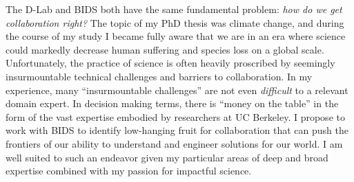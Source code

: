 






\lehead[]{\pagemark}
\rohead[]{\pagemark}




The D-Lab and BIDS both have the same fundamental problem: \emph{how do we get
    collaboration right?} The topic of my PhD thesis was climate change, and
during the course of my study I became fully aware that we are in an era where
science could markedly decrease human suffering and species loss on a global
scale. Unfortunately, the practice of science is often heavily proscribed by
seemingly insurmountable technical challenges and barriers to collaboration. In
my experience, many “insurmountable challenges” are not even \emph{difficult} to
a relevant domain expert. In decision making terms, there is “money on the
table” in the form of the vast expertise embodied by researchers at UC Berkeley.
I propose to work with BIDS to identify low-hanging fruit for collaboration that
can push the frontiers of our ability to understand and engineer solutions for
our world. I am well suited to such an endeavor given my particular areas of
deep and broad expertise combined with my passion for impactful science.

